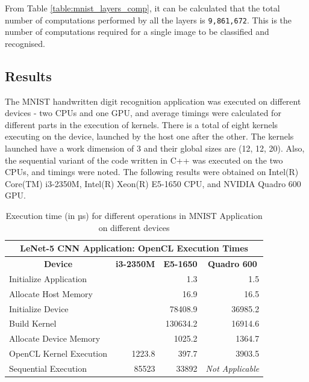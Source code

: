 From Table \ref{table:mnist_layers_comp}, it can be calculated that the total number of computations performed by all the layers is \verb|9,861,672|. This is the number of computations required for a single image to be classified and recognised.

\subsection{Results}
\label{sect5_3_2}
The MNIST handwritten digit recognition application was executed on different devices - two CPUs and one GPU, and average timings were calculated for different parts in the execution of kernels. There is a total of eight kernels executing on the device, launched by the host one after the other. The kernels launched have a work dimension of 3 and their global sizes are (12, 12, 20). Also, the sequential variant of the code written in C++ was executed on the two CPUs, and timings were noted. \newline\newline
The following results were obtained on Intel(R) Core(TM) i3-2350M, Intel(R) Xeon(R) E5-1650 CPU, and NVIDIA Quadro 600 GPU.

\begin{table}[h!]
\centering
 \caption{Execution time (in µs) for different operations in MNIST Application on different devices}
 \vspace{3mm}
 \renewcommand\arraystretch{1.6}
 \begin{tabular}{ | m{12em} | r | r | r |  }
 \hline
 \multicolumn{4}{|c|}{LeNet-5 CNN Application: OpenCL Execution Times} \\
 \hline
 \multicolumn{1}{|c|}{\bfseries Device} & \multicolumn{1}{c|}{\bfseries i3-2350M} & \multicolumn{1}{c|}{\bfseries E5-1650} & \multicolumn{1}{c|}{\bfseries Quadro 600} \\
 \hline
 Initialize Application & & 1.3 & 1.5 \\
 \hline
 Allocate Host Memory & & 16.9 & 16.5 \\
 \hline
 Initialize Device & & 78408.9 & 36985.2 \\ 
 \hline
 Build Kernel & & 130634.2 & 16914.6 \\
 \hline
 Allocate Device Memory &  & 1025.2 & 1364.7 \\
 \hline
 OpenCL Kernel Execution &1223.8 &  397.7 & 3903.5 \\
 \hline
 Sequential Execution & 85523 &  33892 & \textit{Not Applicable} \\
 \hline
 \end{tabular}
 \label{table:mnist_timings}
\end{table}

